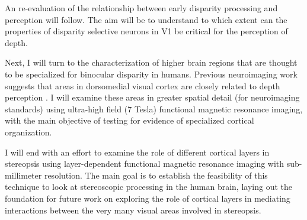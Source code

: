 An re-evaluation of the relationship between early disparity processing and perception will follow. The aim will be to understand to which extent can the properties of disparity selective neurons in V1 be critical for the perception of depth.

Next, I will turn to the characterization of higher brain regions that are thought to be specialized for binocular disparity in humans. Previous neuroimaging work suggests that areas in dorsomedial visual cortex are closely related to depth perception \cite{Backus:2001ly,Tsao:2003lk,Preston:2008dg}. I will examine these areas in greater spatial detail (for neuroimaging standards) using ultra-high field (7 Tesla) functional magnetic resonance imaging, with the main objective of testing for evidence of specialized cortical organization.

I will end with an effort to examine the role of different cortical layers in stereopsis using layer-dependent functional magnetic resonance imaging with sub-millimeter resolution. The main goal is to establish the feasibility of this technique to look at stereoscopic processing in the human brain, laying out the foundation for future work on exploring the role of cortical layers in mediating interactions between the very many visual areas involved in stereopsis.



